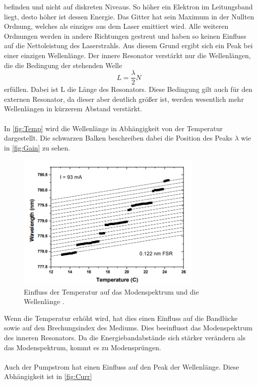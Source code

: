 befinden und nicht auf diskreten Niveaus. So höher ein Elektron im Leitungsband liegt, desto höher ist dessen Energie.
Das Gitter hat sein Maximum in der Nullten Ordnung, welches als einziges aus dem Laser emittiert wird. Alle weiteren Ordnungen werden
in andere Richtungen gestreut und haben so keinen Einfluss auf die Nettoleistung des Laserstrahls. 
Aus diesem Grund ergibt sich ein Peak bei einer einzigen Wellenlänge.
Der innere Resonator verstärkt nur die Wellenlängen, die die Bedingung der stehenden Welle 
\begin{equation*}
    L = \frac{\lambda}{2}N
\end{equation*}
erfüllen. Dabei ist L die Länge des Resonators. Diese Bedingung gilt auch für den externen Resonator, da dieser aber deutlich größer ist, 
werden wesentlich mehr Wellenlängen in kürzerem Abstand verstärkt. 
\\
\\
In \autoref{fig:Temp} wird die Wellenlänge in Abhängigkeit von der Temperatur dargestellt. 
Die schwarzen Balken beschreiben dabei die Position des Peaks $\lambda$ wie in \autoref{fig:Gain} 
zu sehen. 
\begin{figure}
    \centering
    \includegraphics[width=0.8\textwidth]{ModeTemp.png}
    \caption{Einfluss der Temperatur auf das Modenspektrum und die Wellenlänge \cite{ap60}.}
    \label{fig:Temp}
\end{figure}
Wenn die Temperatur erhöht wird, hat dies einen Einfluss auf die Bandlücke sowie auf den Brechungsindex des 
Mediums. Dies beeinflusst das Modenspektrum des inneren Resonators. Da die Energiebandabstände sich stärker verändern 
als das Modenspektrum, kommt es zu Modensprüngen.
\\
\\
Auch der Pumpstrom hat einen Einfluss auf den Peak der Wellenlänge. Diese Abhängigkeit ist in \autoref{fig:Curr}
